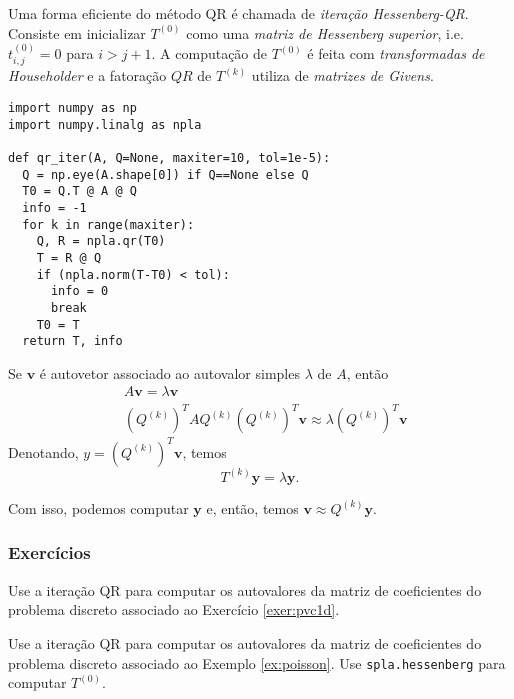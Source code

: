 Uma forma eficiente do método QR é chamada de \emph{iteração Hessenberg}{\hessenberg}\emph{-QR}. Consiste em inicializar $T^{(0)}$ como uma \emph{matriz de Hessenberg superior}, i.e. $t^{(0)}_{i,j}=0$ para $i>j+1$. A computação de $T^{(0)}$ é feita com \emph{transformadas de Householder} e a fatoração $QR$ de $T^{(k)}$ utiliza de \emph{matrizes de Givens}{\givens}.

% 
\begin{lstlisting}[caption=Algoritmo da Iteração QR, label={lst:pyQRIter}]
import numpy as np
import numpy.linalg as npla

def qr_iter(A, Q=None, maxiter=10, tol=1e-5):
  Q = np.eye(A.shape[0]) if Q==None else Q
  T0 = Q.T @ A @ Q
  info = -1
  for k in range(maxiter):
    Q, R = npla.qr(T0)
    T = R @ Q
    if (npla.norm(T-T0) < tol):
      info = 0
      break
    T0 = T
  return T, info  
\end{lstlisting}

\begin{obs}
  Se $\pmb{v}$ é autovetor associado ao autovalor simples $\lambda$ de $A$, então
  \begin{align}
    & A\pmb{v} = \lambda \pmb{v}\\
    & (Q^{(k)})^TAQ^{(k)}(Q^{(k)})^T\pmb{v} \approx \lambda (Q^{(k)})^T\pmb{v}
  \end{align}
  Denotando, $y = (Q^{(k)})^T\pmb{v}$, temos
  \begin{equation}
    T^{(k)}\pmb{y} = \lambda \pmb{y}.
  \end{equation}

  Com isso, podemos computar $\pmb{y}$ e, então, temos $\pmb{v}\approx Q^{(k)}\pmb{y}$.
\end{obs}

\subsubsection{Exercícios}

\begin{exer}
  Use a iteração QR para computar os autovalores da matriz de coeficientes do problema discreto associado ao Exercício \ref{exer:pvc1d}.
\end{exer}

\begin{exer}
  Use a iteração QR para computar os autovalores da matriz de coeficientes do problema discreto associado ao Exemplo \ref{ex:poisson}. Use \lstinline+spla.hessenberg+ para computar $T^{(0)}$.
\end{exer}
